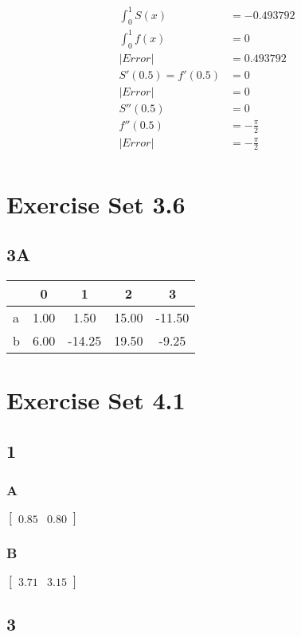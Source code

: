 \documentclass{oisinclass}
\begin{document}
\begin{align*}
	\int_{0}^{1}S(x)  & = -0.493792      \\
	\int_{0}^{1}f(x)  & = 0              \\
	|Error|           & = 0.493792       \\[3.5ex]
	S'(0.5) = f'(0.5) & = 0              \\
	|Error|           & = 0              \\[3.5ex]
	S''(0.5)          & = 0              \\
	f''(0.5)          & = -\frac{\pi}{2} \\
	|Error|           & = -\frac{\pi}{2} \\
\end{align*}

\section*{Exercise Set 3.6}
\subsection*{3A}
\begin{tabular}{l|cccc}
	  & 0    & 1      & 2     & 3      \\
	\toprule{}
	a & 1.00 & 1.50   & 15.00 & -11.50 \\
	b & 6.00 & -14.25 & 19.50 & -9.25
\end{tabular}

\section*{Exercise Set 4.1}
\subsection*{1}
\subsubsection*{A}
\(
\begin{bmatrix}
	0.85 & 0.80
\end{bmatrix}
\)
\subsubsection*{B}
\(
\begin{bmatrix}
	3.71 & 3.15
\end{bmatrix}
\)

\subsection*{3}
\end{document}
